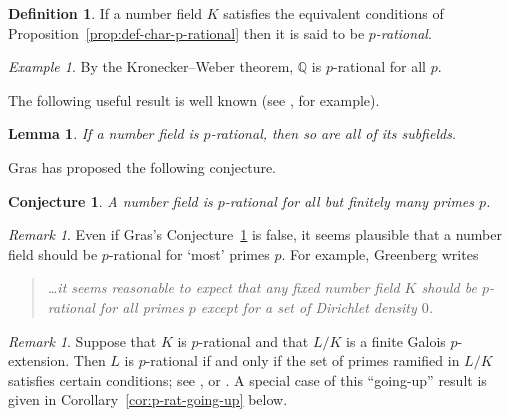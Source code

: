 \documentclass[12pt, a4paper, usenames]{amsart}
\newcommand{\Q}{\mathbb{Q}}
\theoremstyle{plain}
\newtheorem{lemma}[theorem]{Lemma}
\newtheorem{conj}[theorem]{Conjecture}
\theoremstyle{remark}
\newtheorem{remark}[theorem]{Remark}
\newtheorem{example}[theorem]{Example}
\theoremstyle{definition}
\newtheorem{definition}[theorem]{Definition}
\begin{document}
\begin{definition}\label{def:p-rat}
If a number field $K$ satisfies  
the equivalent conditions of Proposition~\ref{prop:def-char-p-rational}
then it is said to be \textit{$p$-rational}.
\end{definition}

\begin{example}
By the Kronecker--Weber theorem, $\Q$ is $p$-rational for all $p$.    
\end{example}

The following useful result is well known (see \cite[IV, 3.4.5]{MR1941965}, for example).

\begin{lemma}\label{lem:p-rat-subfields}
If a number field is $p$-rational, then so are all of its subfields.    
\end{lemma}

Gras \cite[Conjecture~8.11]{MR3492629} has proposed the following conjecture.

\begin{conj}\label{conj:Gras}
A number field is $p$-rational for all but finitely many primes $p$.
\end{conj}

\begin{remark}\label{rmk:Dirichlet-density-0}
Even if Gras's Conjecture~\ref{conj:Gras} is false, it seems plausible that
a number field should be $p$-rational for `most' primes $p$. For example,
Greenberg \cite[\S 4.2]{MR3512524} writes
\begin{quote}
\textit{\ldots it seems reasonable to expect that any fixed number field $K$ should
be $p$-rational for all primes $p$ except for a set of Dirichlet density $0$.}  
\end{quote}
\end{remark}

\begin{remark}\label{rmk:going-up}
Suppose that $K$ is $p$-rational and that $L/K$ is a finite Galois $p$-extension. 
Then
$L$ is $p$-rational if and only if the set of primes ramified in $L/K$
satisfies certain conditions; see
\cite[Th\'eor\`eme $(\beta)$, p.\ 344]{MR1017575}, \cite[Th\'eor\`eme~3]{MR1124802} or \cite[Th\'eor\`eme~3.5]{MR1265910}.
A special case of this ``going-up'' result is given in Corollary~\ref{cor:p-rat-going-up} below.
\end{remark}
\end{document}
